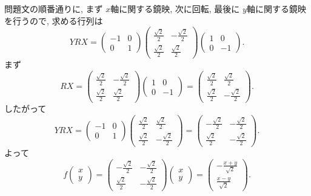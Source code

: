 \documentclass[uplatex,dvipdfmx,a4paper,14pt]{jsarticle}
\begin{document}
問題文の順番通りに, まず $x$軸に関する鏡映, 次に回転, 最後に $y$軸に関する鏡映を行うので, 求める行列は
\[
YRX
=
\begin{pmatrix}-1&0\\0&1\end{pmatrix}
\begin{pmatrix}
\frac{\sqrt2}{2}&-\frac{\sqrt2}{2}\\
\frac{\sqrt2}{2}&\frac{\sqrt2}{2}
\end{pmatrix}
\begin{pmatrix}1&0\\0&-1\end{pmatrix}.
\]
まず
\[
RX=
\begin{pmatrix}
\frac{\sqrt2}{2}&-\frac{\sqrt2}{2}\\
\frac{\sqrt2}{2}&\frac{\sqrt2}{2}
\end{pmatrix}
\begin{pmatrix}1&0\\0&-1\end{pmatrix}
=
\begin{pmatrix}
\frac{\sqrt2}{2}&\frac{\sqrt2}{2}\\
\frac{\sqrt2}{2}&-\frac{\sqrt2}{2}
\end{pmatrix}.
\]
したがって
\[
YRX=
\begin{pmatrix}-1&0\\0&1\end{pmatrix}
\begin{pmatrix}
\frac{\sqrt2}{2}&\frac{\sqrt2}{2}\\
\frac{\sqrt2}{2}&-\frac{\sqrt2}{2}
\end{pmatrix}
=
\begin{pmatrix}
-\frac{\sqrt2}{2}&-\frac{\sqrt2}{2}\\
\frac{\sqrt2}{2}&-\frac{\sqrt2}{2}
\end{pmatrix}.
\]
よって
\[
\boxed{
 f\begin{pmatrix}x\\y\end{pmatrix}
 =
\begin{pmatrix}
-\frac{\sqrt2}{2}&-\frac{\sqrt2}{2}\\
\frac{\sqrt2}{2}&-\frac{\sqrt2}{2}
\end{pmatrix}
\begin{pmatrix}x\\y\end{pmatrix}
=
\begin{pmatrix}
-\frac{x+y}{\sqrt2}\\[1mm]
\frac{x-y}{\sqrt2}
\end{pmatrix}.}
\]
\end{document}
